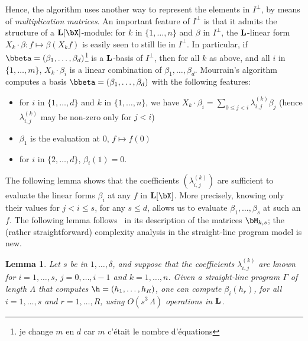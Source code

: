 \documentclass[12pt]{article}
\newtheorem{lemma}[definition]{Lemma}
\begin{document}
Hence, the algorithm uses another way to represent the elements in
$I^{\perp}$, by means of {\em multiplication matrices}. An important
feature of $I^{\perp}$ is that it admits the structure of a
$\LL[\bX]$-module: for $k$ in $\{1,\dots,n\}$ and $\beta$ in
$I^{\perp}$, the $\mathbf{L}$-linear form
$X_k \cdot \beta: f \mapsto \beta(X_k f)$ is easily seen to still lie
in $I^{\perp}$.  In particular, if
$\bbeta=(\beta_1,\dots,\beta_d)$\footnote{\check je change $m$ en
  $d$ car $m$ c'\'etait le nombre d'\'equations} is a $\mathbf{L}$-basis
of $I^{\perp}$, then for all $k$ as above, and all $i$ in
$\{1,\dots,m\}$, $X_k \cdot \beta_i$ is a linear combination of
$\beta_1,\dots,\beta_d$. Mourrain's algorithm computes a basis
$\bbeta=(\beta_1,\dots,\beta_d)$ with the following features:
\begin{itemize}
\item for $i$ in $\{1,\dots,d\}$ and $k$ in $\{1,\dots,n\}$, we have
  $X_k \cdot \beta_i=\sum_{0 \le j < i} \lambda^{(k)}_{i,j} \beta_j$
  (hence $\lambda^{(k)}_{i,j}$ may be non-zero 
  only for $j<i$)
\item $\beta_1$ is the evaluation at $0$, $f \mapsto f(0)$
\item for $i$ in $\{2,\dots,d\}$, $\beta_i(1)=0$.
\end{itemize}
The following lemma shows that the coefficients $(\lambda^{(k)}_{i,j})$
are sufficient to evaluate  the linear forms $\beta_i$ at any $f$ in
$\LL[\bX]$. More precisely, knowing only their values for $j < i \le s$,
for any $s \le d$, allows us to evaluate $\beta_1,\dots,\beta_s$ at such an $f$.
The following lemma follows~\cite{Mourrain97} in its description
of the matrices $\bM_{k,s}$; the (rather straightforward) complexity analysis 
in the straight-line program model is new.
\begin{lemma}\label{lemma:evalbeta}
   Let $s$ be in $1,\dots,\delta$, and suppose that the coefficients
  $\lambda^{(k)}_{i,j}$ are known for $i=1,\dots,s$, $j=0,\dots,i-1$
  and $k=1,\dots,n$. Given a straight-line program $\Gamma$ of length
  $\Lambda$ that computes $\h=(h_1,\dots,h_R)$, one can compute
  $\beta_i(h_r)$, for all $i=1,\dots,s$ and $r=1,\dots,R$, using
  $O(s^3\,\Lambda)$ operations in $\mathbf{L}$.
\end{lemma}
\end{document}
